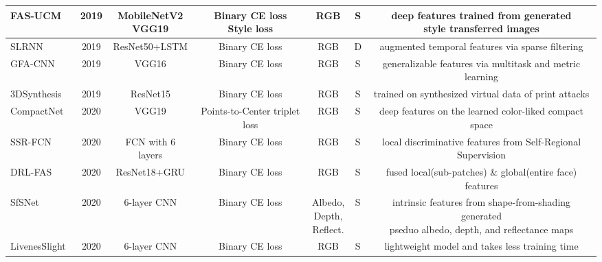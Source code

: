\documentclass[10pt,journal,compsoc]{IEEEtran}
\begin{document}
\begin{table}
{\begin{tabular}{l c c c c c c}
   \midrule
FAS-UCM~\cite{laurensi2019style} & 2019 & \tabincell{c}{MobileNetV2\\VGG19}  & \tabincell{c}{Binary CE loss\\Style loss} & RGB & S & \tabincell{c}{deep features trained from generated \\style transferred images}  \\ 


   \midrule
 SLRNN~\cite{muhammad2019face} & 2019 & ResNet50+LSTM  & Binary CE loss & RGB & D & augmented temporal features via sparse filtering\\ 

   \midrule
GFA-CNN~\cite{tu2020learning} & 2019 & VGG16  & Binary CE loss & RGB & S & generalizable features via multitask and metric learning  \\ 

   \midrule
3DSynthesis~\cite{8987415} & 2019 & ResNet15  & Binary CE loss & RGB & S & trained on synthesized virtual data of print attacks \\   

  
  
 \midrule
 CompactNet~\cite{li2020compactnet} & 2020 & VGG19  & Points-to-Center triplet loss & RGB & S & deep features on the learned color-liked compact space\\ 

 \midrule
 SSR-FCN~\cite{deb2020look} & 2020 & FCN with 6 layers  & Binary CE loss & RGB & S & local discriminative features from Self-Regional Supervision\\

 


    \midrule
 DRL-FAS~\cite{cai2020drl} & 2020 & ResNet18+GRU & Binary CE loss & RGB & S & fused local(sub-patches) \& global(entire face) features\\ 
 
   \midrule
SfSNet~\cite{pinto2020leveraging} & 2020 & 6-layer CNN  & Binary CE loss & \tabincell{c}{Albedo,\\ Depth,\\ Reflect.} & S & \tabincell{c}{ intrinsic features from shape-from-shading generated\\ pseduo albedo, depth, and reflectance maps}\\
 
   \midrule
LivenesSlight~\cite{zuo2020face} & 2020 & 6-layer CNN  & Binary CE loss & RGB & S & lightweight model and takes less training time\\ 
 

\end{tabular}}
\end{table}
\end{document}
